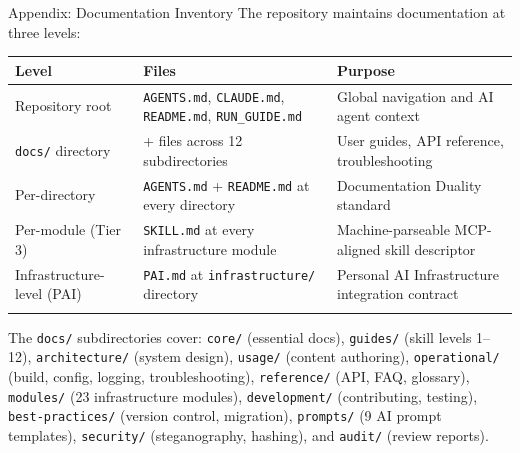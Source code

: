 \documentclass[
  ignorenonframetext,
]{beamer}
\author{\texorpdfstring{}{}}
\date{}
\newcounter{none} %
\begin{document}
\begin{frame}
\newpage
\end{frame}

\begin{frame}{Appendix: Documentation
Inventory}
\protect{}\label{appendix-docs}
The repository maintains documentation at three levels:

\begin{table}[h]
\caption{Documentation inventory across the four-layer documentation architecture, from repository-wide system files to per-module skill descriptors.}
\label{tab:documentation-inventory}
\end{table}

{\def\LTcaptype{none} %
\begin{longtable}[]{@{}
  >{\raggedright\arraybackslash}p{}
  >{\centering\arraybackslash}p{}
  >{\raggedright\arraybackslash}p{}@{}}
\toprule\noalign{}
\begin{minipage}[b]{\linewidth}\raggedright
Level
\end{minipage} & \begin{minipage}[b]{\linewidth}\centering
Files
\end{minipage} & \begin{minipage}[b]{\linewidth}\raggedright
Purpose
\end{minipage} \\
\midrule\noalign{}
\endhead
Repository root & \texttt{AGENTS.md}, \texttt{CLAUDE.md},
\texttt{README.md}, \texttt{RUN\_GUIDE.md} & Global navigation and AI
agent context \\
\texttt{docs/} directory & 90+ files across 12 subdirectories & User
guides, API reference, troubleshooting \\
Per-directory & \texttt{AGENTS.md} + \texttt{README.md} at every
directory & Documentation Duality standard \\
Per-module (Tier 3) & \texttt{SKILL.md} at every infrastructure module &
Machine-parseable MCP-aligned skill descriptor \\
Infrastructure-level (PAI) & \texttt{PAI.md} at \texttt{infrastructure/}
directory & Personal AI Infrastructure integration contract \\
\bottomrule\noalign{}
\end{longtable}
}

The \texttt{docs/} subdirectories cover: \texttt{core/} (essential
docs), \texttt{guides/} (skill levels 1--12), \texttt{architecture/}
(system design), \texttt{usage/} (content authoring),
\texttt{operational/} (build, config, logging, troubleshooting),
\texttt{reference/} (API, FAQ, glossary), \texttt{modules/} (23
infrastructure modules), \texttt{development/} (contributing, testing),
\texttt{best-practices/} (version control, migration), \texttt{prompts/}
(9 AI prompt templates), \texttt{security/} (steganography, hashing),
and \texttt{audit/} (review reports).
\end{frame}
\end{document}
